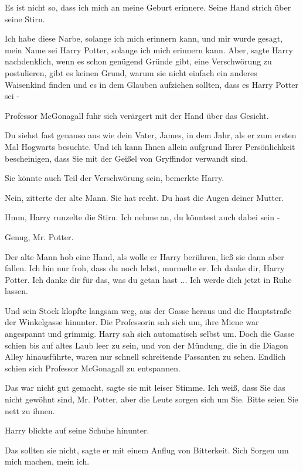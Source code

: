 \glqq{}Es ist nicht so, dass ich mich an meine Geburt erinnere.\grqq{} Seine Hand
strich über seine Stirn.

\glqq{}Ich habe diese Narbe, solange ich mich erinnern kann, und mir wurde
gesagt, mein Name sei Harry Potter, solange ich mich erinnern kann. Aber\grqq{},
sagte Harry nachdenklich, \glqq{}wenn es schon genügend Gründe gibt, eine
Verschwörung zu postulieren, gibt es keinen Grund, warum sie nicht einfach ein
anderes Waisenkind finden und es in dem Glauben aufziehen sollten, dass es Harry
Potter sei -\grqq{}

Professor McGonagall fuhr sich verärgert mit der Hand über das Gesicht.

\glqq{}Du siehst fast genauso aus wie dein Vater, James, in dem Jahr, als er zum
ersten Mal Hogwarts besuchte. Und ich kann Ihnen allein aufgrund Ihrer
Persönlichkeit bescheinigen, dass Sie mit der Geißel von Gryffindor verwandt
sind.\grqq{}

\glqq{}Sie könnte auch Teil der Verschwörung sein\grqq{}, bemerkte Harry.

\glqq{}Nein\grqq{}, zitterte der alte Mann. \glqq{}Sie hat recht. Du hast die
Augen deiner Mutter.\grqq{}

\glqq{}Hmm\grqq{}, Harry runzelte die Stirn. \glqq{}Ich nehme an, du könntest auch
dabei sein -\grqq{}

\glqq{}Genug, Mr. Potter.\grqq{}

Der alte Mann hob eine Hand, als wolle er Harry berühren, ließ sie dann aber
fallen. \glqq{}Ich bin nur froh, dass du noch lebst\grqq{}, murmelte er. \glqq{}
Ich danke dir, Harry Potter. Ich danke dir für das, was du getan hast ... Ich
werde dich jetzt in Ruhe lassen.\grqq{}

Und sein Stock klopfte langsam weg, aus der Gasse heraus und die Hauptstraße der
Winkelgasse hinunter. Die Professorin sah sich um, ihre Miene war angespannt und
grimmig. Harry sah sich automatisch selbst um. Doch die Gasse schien bis auf
altes Laub leer zu sein, und von der Mündung, die in die Diagon Alley
hinausführte, waren nur schnell schreitende Passanten zu sehen. Endlich schien
sich Professor McGonagall zu entspannen.

\glqq{}Das war nicht gut gemacht\grqq{}, sagte sie mit leiser Stimme. \glqq{}Ich
weiß, dass Sie das nicht gewöhnt sind, Mr. Potter, aber die Leute sorgen sich um
Sie. Bitte seien Sie nett zu ihnen.\grqq{}

Harry blickte auf seine Schuhe hinunter.

\glqq{}Das sollten sie nicht\grqq{}, sagte er mit einem Anflug von Bitterkeit.
\glqq{}Sich Sorgen um mich machen, mein ich.\grqq{}

